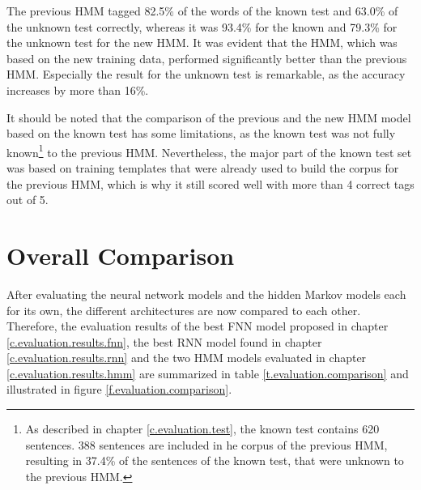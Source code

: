 The previous HMM tagged 82.5\% of the words of the known test and 63.0\% of the unknown test correctly, whereas it was 93.4\% for the known and 79.3\% for the unknown test for the new HMM. It was evident that the HMM, which was based on the new training data, performed significantly better than the previous HMM. Especially the result for the unknown test is remarkable, as the accuracy increases by more than 16\%.

It should be noted that the comparison of the previous and the new HMM model based on the known test has some limitations, as the known test was not fully known\footnote{As described in chapter \ref{c.evaluation.test}, the known test contains 620 sentences. 388 sentences are included in he corpus of the previous HMM, resulting in 37.4\% of the sentences of the known test, that were unknown to the previous HMM.} to the previous HMM. Nevertheless, the major part of the known test set was based on training templates that were already used to build the corpus for the previous HMM, which is why it still scored well with more than 4 correct tags out of 5.

\section{Overall Comparison}\label{c.evaluation.comparison}
After evaluating the neural network models and the hidden Markov models each for its own, the different architectures are now compared to each other. Therefore, the evaluation results of the best FNN model proposed in chapter \ref{c.evaluation.results.fnn}, the best RNN model found in chapter \ref{c.evaluation.results.rnn} and the two HMM models evaluated in chapter \ref{c.evaluation.results.hmm} are summarized in table \ref{t.evaluation.comparison} and illustrated in figure \ref{f.evaluation.comparison}.

